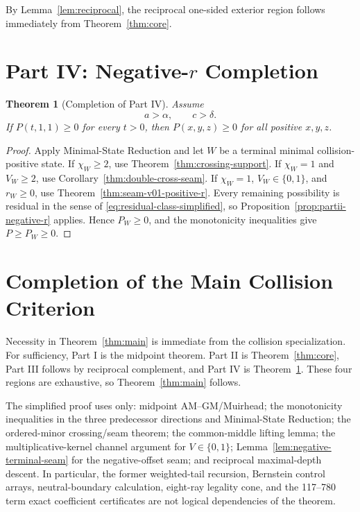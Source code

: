 \documentclass[11pt]{article}
\newtheorem{theorem}{Theorem}[section]
\theoremstyle{definition}
\begin{document}
By Lemma~\ref{lem:reciprocal}, the reciprocal one-sided exterior region follows immediately from Theorem~\ref{thm:core}.
\section{Part IV: Negative-\texorpdfstring{\(r\)}{r} Completion}
\label{sec:negative-r}

\begin{theorem}[Completion of Part IV]
\label{thm:negative-r}
Assume
\begin{equation*}
a>\alpha,
\qquad c>\delta.
\end{equation*}
If \(P(t,1,1)\ge0\) for every \(t>0\), then \(P(x,y,z)\ge0\) for all positive \(x,y,z\).
\end{theorem}

\begin{proof}
Apply Minimal-State Reduction and let \(W\) be a terminal minimal collision-positive state.  If \(\chi_W\ge2\), use Theorem~\ref{thm:crossing-support}.  If \(\chi_W=1\) and \(V_W\ge2\), use Corollary~\ref{thm:double-cross-seam}.  If \(\chi_W=1\), \(V_W\in\{0,1\}\), and \(r_W\ge0\), use Theorem~\ref{thm:seam-v01-positive-r}.  Every remaining possibility is residual in the sense of \eqref{eq:residual-class-simplified}, so Proposition~\ref{prop:partii-negative-r} applies.  Hence \(P_W\ge0\), and the monotonicity inequalities give \(P\ge P_W\ge0\).
\end{proof}

\section{Completion of the Main Collision Criterion}
\label{sec:global-assembly}

Necessity in Theorem~\ref{thm:main} is immediate from the collision specialization.  For sufficiency, Part I is the midpoint theorem.  Part II is Theorem~\ref{thm:core}, Part III follows by reciprocal complement, and Part IV is Theorem~\ref{thm:negative-r}.  These four regions are exhaustive, so Theorem~\ref{thm:main} follows.

The simplified proof uses only: midpoint AM--GM/Muirhead; the monotonicity inequalities in the three predecessor directions and Minimal-State Reduction; the ordered-minor crossing/seam theorem; the common-middle lifting lemma; the multiplicative-kernel channel argument for \(V\in\{0,1\}\); Lemma~\ref{lem:negative-terminal-seam} for the negative-offset seam; and reciprocal maximal-depth descent.  In particular, the former weighted-tail recursion, Bernstein control arrays, neutral-boundary calculation, eight-ray legality cone, and the 117--780 term exact coefficient certificates are not logical dependencies of the theorem.
\end{document}
